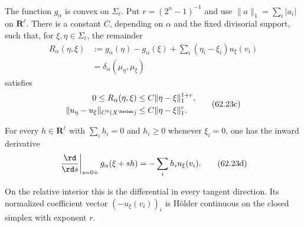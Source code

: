 \begin{proposition}\label{prop:mpwn-mass-derivative}
The function $g_\alpha$ is convex on $\Sigma_\ell$. Put $r=(2^n-1)^{-1}$ and use $\|a\|_1=\sum_i|a_i|$ on $\mathbf R^\ell$. There is a constant $C$, depending on $\alpha$ and the fixed divisorial support, such that, for $\xi,\eta\in\Sigma_\ell$, the remainder
\[
 \begin{aligned}
 R_\alpha(\eta,\xi)
 &:=g_\alpha(\eta)-g_\alpha(\xi)
            +\sum_i(\eta_i-\xi_i)u_\xi(v_i)\\
 &=\delta_\alpha(\mu_\eta,\mu_\xi)
 \end{aligned}
\tag{62.23b}\label{eq:mpwn-mass-remainder}
\]
satisfies
\[
 \begin{aligned}
 0\leq R_\alpha(\eta,\xi)&\leq C\|\eta-\xi\|_1^{1+r},\\
 \|u_\eta-u_\xi\|_{C^0(X^{\bethan})}
                       &\leq C\|\eta-\xi\|_1^r.
 \end{aligned}
\tag{62.23c}\label{eq:mpwn-mass-holder}
\]
\par\noindent\begin{minipage}{\linewidth}
For every $h\in\mathbf R^\ell$ with $\sum_i h_i=0$ and $h_i\geq0$ whenever $\xi_i=0$, one has the inward derivative
\[
 \left.\frac{\rd}{\rd s}\right|_{s=0+}g_\alpha(\xi+sh)
                         =-\sum_i h_i u_\xi(v_i).
\tag{62.23d}\label{eq:mpwn-mass-derivative}
\]
\end{minipage}\par
On the relative interior this is the differential in every tangent direction. Its normalized coefficient vector $(-u_\xi(v_i))_i$ is H\"older continuous on the closed simplex with exponent $r$.
\end{proposition}


